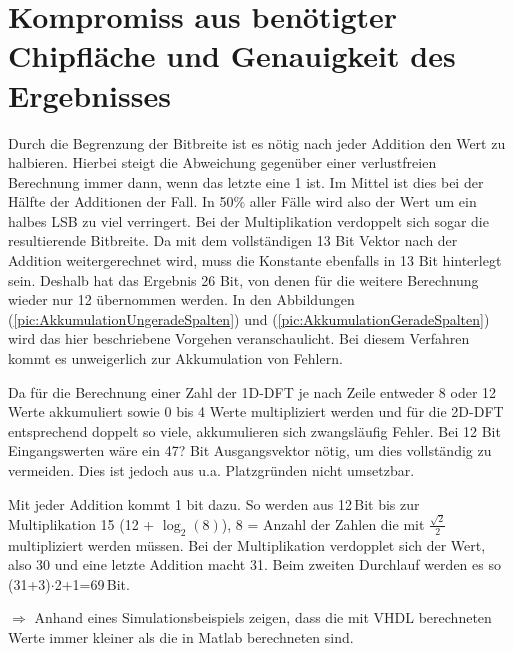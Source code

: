 \section{Kompromiss aus benötigter Chipfläche und Genauigkeit des Ergebnisses}
Durch die Begrenzung der Bitbreite ist es nötig nach jeder Addition den Wert zu halbieren. Hierbei steigt die Abweichung gegenüber einer verlustfreien Berechnung immer dann, 
wenn das letzte eine 1 ist. Im Mittel ist dies bei der Hälfte der Additionen der Fall. In 50$\%$ aller Fälle wird also der Wert um ein halbes LSB zu viel verringert.
Bei der Multiplikation verdoppelt sich sogar die resultierende Bitbreite. Da mit dem vollständigen 13 Bit Vektor nach der Addition weitergerechnet wird, muss die Konstante
ebenfalls in 13 Bit hinterlegt sein. Deshalb hat das Ergebnis 26 Bit, von denen für die weitere Berechnung wieder nur 12 übernommen werden. In den Abbildungen 
(\ref{pic:AkkumulationUngeradeSpalten}) und (\ref{pic:AkkumulationGeradeSpalten}) wird das hier beschriebene Vorgehen veranschaulicht. Bei diesem Verfahren
kommt es unweigerlich zur Akkumulation von Fehlern.
 
Da für die Berechnung einer Zahl der 1D-DFT je nach Zeile entweder 8 oder 12 Werte akkumuliert sowie 0 bis 4 Werte multipliziert werden und für die 2D-DFT entsprechend doppelt 
so viele, akkumulieren sich zwangsläufig Fehler. Bei 12 Bit Eingangswerten wäre ein 47? Bit Ausgangsvektor nötig, um dies vollständig zu vermeiden. Dies ist jedoch aus u.a.
Platzgründen nicht umsetzbar.

Mit jeder Addition kommt 1 bit dazu. So werden aus 12\,Bit bis zur Multiplikation 15 (12 + $\log_2(8)$), 8 = Anzahl der Zahlen die mit $\tfrac{\sqrt{2}}{2}$ multipliziert
werden müssen. Bei der Multiplikation verdopplet sich der Wert, also 30 und eine letzte Addition macht 31.
Beim zweiten Durchlauf werden es so (31+3)$\cdot$2+1=69\,Bit.

$\Rightarrow$ Anhand eines Simulationsbeispiels zeigen, dass die mit VHDL berechneten Werte immer kleiner als die in Matlab berechneten sind.
